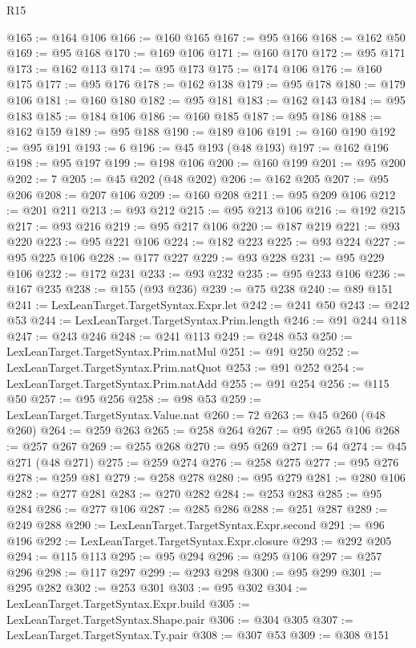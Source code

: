 \begin{lexlean}{R15}
\begin{coremodule}
{{{{{{{{{{{{{{{{{{{{{{{{{{{{{{{{{{{{{{{{{{{{{{{{{{{{{{{{{{{{{{{{{{{{{{@165 := @164 @106
@166 := @160 @165
@167 := @95 @166
@168 := @162 @50
@169 := @95 @168
@170 := @169 @106
@171 := @160 @170
@172 := @95 @171
@173 := @162 @113
@174 := @95 @173
@175 := @174 @106
@176 := @160 @175
@177 := @95 @176
@178 := @162 @138
@179 := @95 @178
@180 := @179 @106
@181 := @160 @180
@182 := @95 @181
@183 := @162 @143
@184 := @95 @183
@185 := @184 @106
@186 := @160 @185
@187 := @95 @186
@188 := @162 @159
@189 := @95 @188
@190 := @189 @106
@191 := @160 @190
@192 := @95 @191
@193 := 6
@196 := @45 @193 (@48 @193)
@197 := @162 @196
@198 := @95 @197
@199 := @198 @106
@200 := @160 @199
@201 := @95 @200
@202 := 7
@205 := @45 @202 (@48 @202)
@206 := @162 @205
@207 := @95 @206
@208 := @207 @106
@209 := @160 @208
@211 := @95 @209 @106
@212 := @201 @211
@213 := @93 @212
@215 := @95 @213 @106
@216 := @192 @215
@217 := @93 @216
@219 := @95 @217 @106
@220 := @187 @219
@221 := @93 @220
@223 := @95 @221 @106
@224 := @182 @223
@225 := @93 @224
@227 := @95 @225 @106
@228 := @177 @227
@229 := @93 @228
@231 := @95 @229 @106
@232 := @172 @231
@233 := @93 @232
@235 := @95 @233 @106
@236 := @167 @235
@238 := @155 (@93 @236)
@239 := @75 @238
@240 := @89 @151
@241 := LexLeanTarget.TargetSyntax.Expr.let
@242 := @241 @50
@243 := @242 @53
@244 := LexLeanTarget.TargetSyntax.Prim.length
@246 := @91 @244 @118
@247 := @243 @246
@248 := @241 @113
@249 := @248 @53
@250 := LexLeanTarget.TargetSyntax.Prim.natMul
@251 := @91 @250
@252 := LexLeanTarget.TargetSyntax.Prim.natQuot
@253 := @91 @252
@254 := LexLeanTarget.TargetSyntax.Prim.natAdd
@255 := @91 @254
@256 := @115 @50
@257 := @95 @256
@258 := @98 @53
@259 := LexLeanTarget.TargetSyntax.Value.nat
@260 := 72
@263 := @45 @260 (@48 @260)
@264 := @259 @263
@265 := @258 @264
@267 := @95 @265 @106
@268 := @257 @267
@269 := @255 @268
@270 := @95 @269
@271 := 64
@274 := @45 @271 (@48 @271)
@275 := @259 @274
@276 := @258 @275
@277 := @95 @276
@278 := @259 @81
@279 := @258 @278
@280 := @95 @279
@281 := @280 @106
@282 := @277 @281
@283 := @270 @282
@284 := @253 @283
@285 := @95 @284
@286 := @277 @106
@287 := @285 @286
@288 := @251 @287
@289 := @249 @288
@290 := LexLeanTarget.TargetSyntax.Expr.second
@291 := @96 @196
@292 := LexLeanTarget.TargetSyntax.Expr.closure
@293 := @292 @205
@294 := @115 @113
@295 := @95 @294
@296 := @295 @106
@297 := @257 @296
@298 := @117 @297
@299 := @293 @298
@300 := @95 @299
@301 := @295 @282
@302 := @253 @301
@303 := @95 @302
@304 := LexLeanTarget.TargetSyntax.Expr.build
@305 := LexLeanTarget.TargetSyntax.Shape.pair
@306 := @304 @305
@307 := LexLeanTarget.TargetSyntax.Ty.pair
@308 := @307 @53
@309 := @308 @151
}}}}}}}}}}}}}}}}}}}}}}}}}}}}}}}}}}}}}}}}}}}}}}}}}}}}}}}}}}}}}}}}}}}}}}
\end{coremodule}
\end{lexlean}
